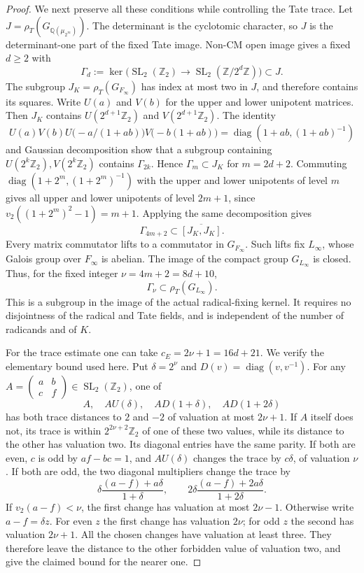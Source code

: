 \documentclass[11pt]{article}
\theoremstyle{definition}
\theoremstyle{remark}
\newcommand{\Q}{\mathbb Q}
\newcommand{\Z}{\mathbb Z}
\begin{document}
\begin{proof}
We next preserve all these conditions while controlling the Tate
trace. Let $J=\rho_T(G_{\Q(\mu_{2^\infty})})$. The determinant is
the cyclotomic character, so $J$ is the determinant-one part of the
fixed Tate image. Non-CM open image \cite{serre} gives a fixed
$d\ge2$ with
\[
 \Gamma_d:=\ker\bigl(\operatorname{SL}_2(\Z_2)
             \to\operatorname{SL}_2(\Z/2^d\Z)\bigr)\subset J.
\]
The subgroup $J_K=\rho_T(G_{F_\infty})$ has index at most two in
$J$, and therefore contains its squares. Write $U(a)$ and $V(b)$
for the upper and lower unipotent matrices. Then $J_K$ contains
$U(2^{d+1}\Z_2)$ and $V(2^{d+1}\Z_2)$. The identity
\[
 U(a)V(b)U\bigl(-a/(1+ab)\bigr)V\bigl(-b(1+ab)\bigr)
       =\operatorname{diag}(1+ab,(1+ab)^{-1})
\]
and Gaussian decomposition show that a subgroup containing
$U(2^k\Z_2),V(2^k\Z_2)$ contains $\Gamma_{2k}$.
Hence $\Gamma_m\subset J_K$ for $m=2d+2$.
Commuting $\operatorname{diag}(1+2^m,(1+2^m)^{-1})$ with the
upper and lower unipotents of level $m$ gives all upper and lower
unipotents of level $2m+1$, since
$v_2((1+2^m)^2-1)=m+1$. Applying the same decomposition gives
\[
 \Gamma_{4m+2}\subset\overline{[J_K,J_K]}.
\]
Every matrix commutator lifts to a commutator in $G_{F_\infty}$.
Such lifts fix $L_\infty$, whose Galois group over $F_\infty$ is
abelian. The image of the compact group $G_{L_\infty}$ is closed.
Thus, for the fixed integer $\nu=4m+2=8d+10$,
\[
                  \Gamma_\nu\subset\rho_T(G_{L_\infty}).       \tag{4.4c}
\]
This is a subgroup in the image of the actual radical-fixing
kernel. It requires no disjointness of the radical and Tate fields,
and is independent of the number of radicands and of $K$.

For the trace estimate one can take $c_E=2\nu+1=16d+21$.
We verify the elementary bound used here. Put $\delta=2^\nu$ and
$D(v)=\operatorname{diag}(v,v^{-1})$. For any
$A=\left(\begin{smallmatrix}a&b\\c&f\end{smallmatrix}\right)
\in\operatorname{SL}_2(\Z_2)$, one of
\[
       A,\quad AU(\delta),\quad AD(1+\delta),\quad AD(1+2\delta)
                                                                    \tag{4.4d}
\]
has both trace distances to $2$ and $-2$ of valuation at most $2\nu+1$.
If $A$ itself does not, its trace is within $2^{2\nu+2}\Z_2$ of
one of these two values, while its distance to the other has valuation
two. Its diagonal entries have the same parity. If both are even,
$c$ is odd by $af-bc=1$, and $AU(\delta)$ changes the trace by
$c\delta$, of valuation $\nu$. If both are odd, the two diagonal
multipliers change the trace by
\[
 \delta\frac{(a-f)+a\delta}{1+\delta},\qquad
 2\delta\frac{(a-f)+2a\delta}{1+2\delta}.
\]
If $v_2(a-f)<\nu$, the first change has valuation at most $2\nu-1$.
Otherwise write $a-f=\delta z$. For even $z$ the first change has
valuation $2\nu$; for odd $z$ the second has valuation $2\nu+1$.
All the chosen changes have valuation at least three. They therefore
leave the distance to the other forbidden value of valuation two,
and give the claimed bound for the nearer one.


\end{proof}
\end{document}
